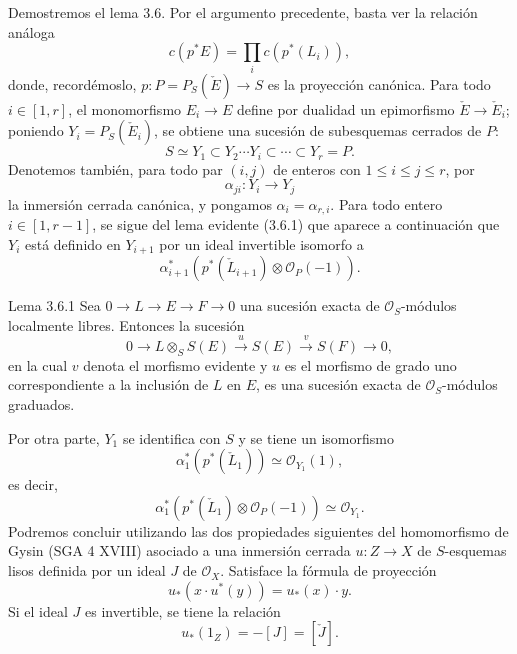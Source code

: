 Demostremos el lema 3.6. Por el argumento precedente, basta ver la relación análoga
\[
c(p^*E)=\prod_i c(p^*(L_i)),
\]
donde, recordémoslo, $p:P=P_S(\check E)\to S$ es la proyección canónica. Para todo $i\in[1,r]$, el monomorfismo $E_i\to E$ define por dualidad un epimorfismo $\check E\to\check E_i$; poniendo $Y_i=P_S(\check E_i)$, se obtiene una sucesión de subesquemas cerrados de $P$:
\[
S\simeq Y_1\subset Y_2\cdots Y_i\subset\cdots\subset Y_r=P.
\]
Denotemos también, para todo par $(i,j)$ de enteros con $1\le i\le j\le r$, por
\[
\alpha_{ji}:Y_i\to Y_j
\]
la inmersión cerrada canónica, y pongamos $\alpha_i=\alpha_{r,i}$. Para todo entero $i\in[1,r-1]$, se sigue del lema evidente (3.6.1) que aparece a continuación que $Y_i$ está definido en $Y_{i+1}$ por un ideal invertible isomorfo a
\[
\alpha_{i+1}^*(p^*(\check L_{i+1})\otimes\mathcal O_P(-1)).
\]

\begin{statement}{Lema 3.6.1}
Sea $0\to L\to E\to F\to0$ una sucesión exacta de $\mathcal O_S$-módulos localmente libres. Entonces la sucesión
\[
0\to L\otimes_S S(E)\xrightarrow{u}S(E)\xrightarrow{v}S(F)\to0,
\]
en la cual $v$ denota el morfismo evidente y $u$ es el morfismo de grado uno correspondiente a la inclusión de $L$ en $E$, es una sucesión exacta de $\mathcal O_S$-módulos graduados.
\end{statement}

Por otra parte, $Y_1$ se identifica con $S$ y se tiene un isomorfismo
\[
\alpha_1^*(p^*(\check L_1))\simeq\mathcal O_{Y_1}(1),
\]
es decir,
\[
\alpha_1^*(p^*(\check L_1)\otimes\mathcal O_P(-1))\simeq \mathcal O_{Y_1}.
\tag{3.6.2}
\]
Podremos concluir utilizando las dos propiedades siguientes del homomorfismo de Gysin (SGA 4 XVIII) asociado a una inmersión cerrada $u:Z\to X$ de $S$-esquemas lisos definida por un ideal $J$ de $\mathcal O_X$. Satisface la fórmula de proyección
\[
u_*(x\cdot u^*(y))=u_*(x)\cdot y.
\tag{3.6.3}
\]
Si el ideal $J$ es invertible, se tiene la relación
\[
u_*(1_Z)=-[J]=[\check J].
\tag{3.6.4}
\]
